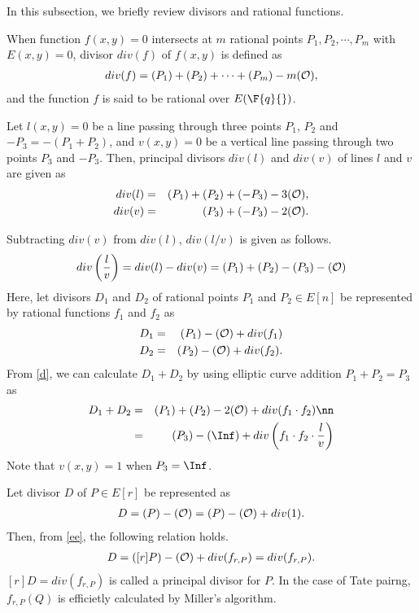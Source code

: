 In this subsection, we briefly review divisors and rational functions.

When function $f(x,y)=0$ intersects at $m$ rational points $P_1, P_2, \cdots, P_m$ with $E(x,y)=0$, 
divisor $div(f)$ of $f(x,y)$ is defined as
\begin{eqnarray*}
div(f) = (P_1) + (P_2)+ \cdots +(P_m) - m({\cal O}), \label{di}
\end{eqnarray*}
and the function $f$ is said to be rational over $E(\F{q}{})$.

Let $l(x,y)=0$ be a line passing through three points $P_1$, $P_2$ and $-P_3 = -(P_1+P_2)$, and $v(x,y)=0$ be a vertical line passing through two points $P_3$ and $-P_3$.
Then, principal divisors $div(l)$ and $div(v)$ of lines $l$ and $v$ are given as
\begin{eqnarray}
div(l) &=& (P_1) + (P_2) + (-P_3) - 3({\cal O}), \nonumber \\
div(v) &=& (P_3) + (-P_3) - 2({\cal O}).\label{inshi}
\end{eqnarray}

Subtracting $div(v)$ from $div(l)$, $div(l/v)$ is given as follows.
\begin{eqnarray}
div\left(\frac{l}{v}\right) = div(l) - div(v) = (P_1) + (P_2) - (P_3) - ({\cal O}) \label{d}
\end{eqnarray}
Here, let divisors $D_1$ and $D_2$ of rational points $P_1$ and $P_2 \in E[n]$ be represented by rational functions $f_1$ and $f_2$ as 
\begin{eqnarray}
 D_1&=&(P_1)-({\cal O})+div(f_1)\nonumber \\
 D_2&=&(P_2)-({\cal O})+div(f_2).\label{dd}
\end{eqnarray}
From \eqref{d}, we can calculate $D_1+D_2$ by using elliptic curve addition $P_1+P_2=P_3$ as 
\begin{eqnarray}
 D_1 + D_2 &=& (P_1)+(P_2)-2({\cal O})+div(f_1\cdot f_2)\nn \\
&=&  (P_3)-(\Inf)+div \left( f_1\cdot f_2 \cdot \frac{l}{v}\right) \label{ee}
\end{eqnarray}
Note that $v(x,y)=1$ when $P_3=\Inf$.

Let divisor $D$ of $P\in E[r]$ be represented as 
\begin{eqnarray}
D = (P) - ({\cal O}) = (P) - ({\cal O}) + div(1).
\end{eqnarray}
Then, from \eqref{ee}, the following relation holds.
\begin{eqnarray}
[r]D = ([r]P) - ({\cal O}) + div(f_{r,P}) = div(f_{r,P}).
\end{eqnarray}
$[r]D= div(f_{r,P})$ is called a principal divisor for $P$.
In the case of Tate pairng, $f_{r,P}(Q)$ is efficietly calculated by Miller's algorithm.

